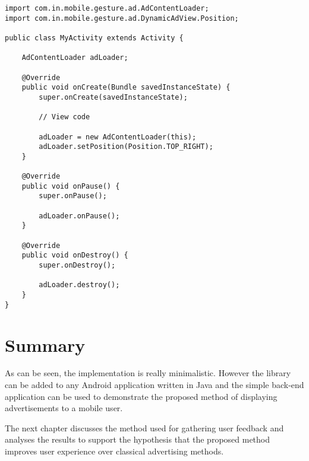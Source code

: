 \begin{lstlisting}
import com.in.mobile.gesture.ad.AdContentLoader;
import com.in.mobile.gesture.ad.DynamicAdView.Position;

public class MyActivity extends Activity {

    AdContentLoader adLoader;

    @Override
    public void onCreate(Bundle savedInstanceState) {
        super.onCreate(savedInstanceState);

        // View code

        adLoader = new AdContentLoader(this);
        adLoader.setPosition(Position.TOP_RIGHT);
    }

    @Override
    public void onPause() {
        super.onPause();

        adLoader.onPause();
    }

    @Override
    public void onDestroy() {
        super.onDestroy();

        adLoader.destroy();
    }
}
\end{lstlisting}

\section{Summary}

As can be seen, the implementation is really minimalistic. However the library can be added to any Android application written in Java and the simple back-end application can be used to demonstrate the proposed method of displaying advertisements to a mobile user.

The next chapter discusses the method used for gathering user feedback and analyses the results to support the hypothesis that the proposed method improves user experience over classical advertising methods.